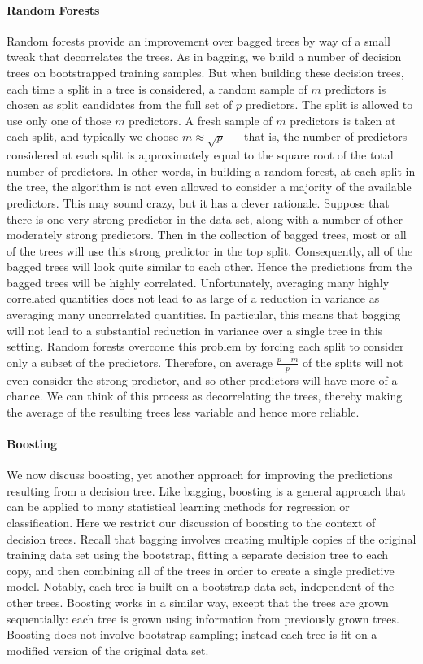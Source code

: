 \paragraph{Random Forests}
Random forests provide an improvement over bagged trees by way of a small tweak that decorrelates
the trees. As in bagging, we build a number of decision trees on bootstrapped training samples. But
when building these decision trees, each time a split in a tree is considered, a random sample of
$m$ predictors is chosen as split candidates from the full set of $p$ predictors. The split is
allowed to use only one of those $m$ predictors. A fresh sample of $m$ predictors is taken at each
split, and typically we choose $m \approx \sqrt{p}$ --- that is, the number of predictors considered
at each split is approximately equal to the square root of the total number of predictors. In other
words, in building a random forest, at each split in the tree, the algorithm is not even allowed to
consider a majority of the available predictors. This may sound crazy, but it has a clever
rationale. Suppose that there is one very strong predictor in the data set, along with a number of
other moderately strong predictors. Then in the collection of bagged trees, most or all of the trees
will use this strong predictor in the top split. Consequently, all of the bagged trees will look
quite similar to each other. Hence the predictions from the bagged trees will be highly correlated.
Unfortunately, averaging many highly correlated quantities does not lead to as large of a reduction
in variance as averaging many uncorrelated quantities. In particular, this means that bagging will
not lead to a substantial reduction in variance over a single tree in this setting. Random forests
overcome this problem by forcing each split to consider only a subset of the predictors. Therefore,
on average $\frac{p-m}{p}$ of the splits will not even consider the strong predictor, and so other
predictors will have more of a chance. We can think of this process as decorrelating the trees,
thereby making the average of the resulting trees less variable and hence more reliable.

\paragraph{Boosting}
We now discuss boosting, yet another approach for improving the predictions resulting from a
decision tree. Like bagging, boosting is a general approach that can be applied to many statistical
learning methods for regression or classification. Here we restrict our discussion of boosting to
the context of decision trees. Recall that bagging involves creating multiple copies of the original
training data set using the bootstrap, fitting a separate decision tree to each copy, and then
combining all of the trees in order to create a single predictive model. Notably, each tree is built
on a bootstrap data set, independent of the other trees. Boosting works in a similar way, except
that the trees are grown sequentially: each tree is grown using information from previously grown
trees. Boosting does not involve bootstrap sampling; instead each tree is fit on a modified version
of the original data set.

